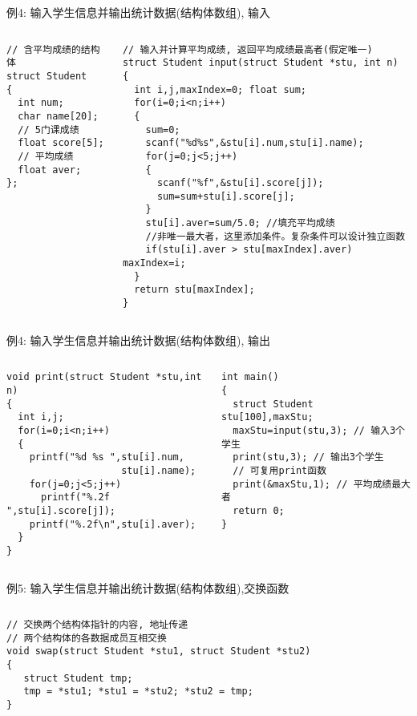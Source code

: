\begin{frame}{例4: 输入学生信息并输出统计数据(结构体数组), 输入}
\vspace{-0.5cm}
\begin{columns}[T]
\begin{lstlisting}
// 含平均成绩的结构体
struct Student 
{ 
  int num;
  char name[20];
  // 5门课成绩
  float score[5];
  // 平均成绩
  float aver;
};
\end{lstlisting}
\begin{lstlisting}[frame=leftline]
// 输入并计算平均成绩, 返回平均成绩最高者(假定唯一)
struct Student input(struct Student *stu, int n)
{
  int i,j,maxIndex=0; float sum;
  for(i=0;i<n;i++) 
  {
    sum=0;
    scanf("%d%s",&stu[i].num,stu[i].name);
    for(j=0;j<5;j++)
    { 
      scanf("%f",&stu[i].score[j]);
      sum=sum+stu[i].score[j];
    }
    stu[i].aver=sum/5.0; //填充平均成绩
    //非唯一最大者，这里添加条件。复杂条件可以设计独立函数
    if(stu[i].aver > stu[maxIndex].aver) maxIndex=i;
  } 
  return stu[maxIndex];
}
\end{lstlisting}
\end{columns}
\medskip
\end{frame}

\begin{frame}{例4: 输入学生信息并输出统计数据(结构体数组), 输出}
\begin{columns}[T]
\begin{lstlisting}
void print(struct Student *stu,int n)
{
  int i,j;
  for(i=0;i<n;i++)
  {
    printf("%d %s ",stu[i].num,
                    stu[i].name);
    for(j=0;j<5;j++) 
      printf("%.2f ",stu[i].score[j]);
    printf("%.2f\n",stu[i].aver);
  }
}
\end{lstlisting}
\begin{lstlisting}[frame=leftline]
int main()
{ 
  struct Student stu[100],maxStu;
  maxStu=input(stu,3); // 输入3个学生 
  print(stu,3); // 输出3个学生
  // 可复用print函数
  print(&maxStu,1); // 平均成绩最大者
  return 0;
}
\end{lstlisting}
\end{columns}
\medskip
\end{frame}

\begin{frame}{\small 例5: 输入学生信息并输出统计数据(结构体数组),交换函数}
\begin{columns}[T]
\begin{lstlisting}
// 交换两个结构体指针的内容, 地址传递
// 两个结构体的各数据成员互相交换 
void swap(struct Student *stu1, struct Student *stu2)
{
   struct Student tmp;
   tmp = *stu1; *stu1 = *stu2; *stu2 = tmp;
}

\end{lstlisting}
\end{columns}
\medskip
\end{frame}

